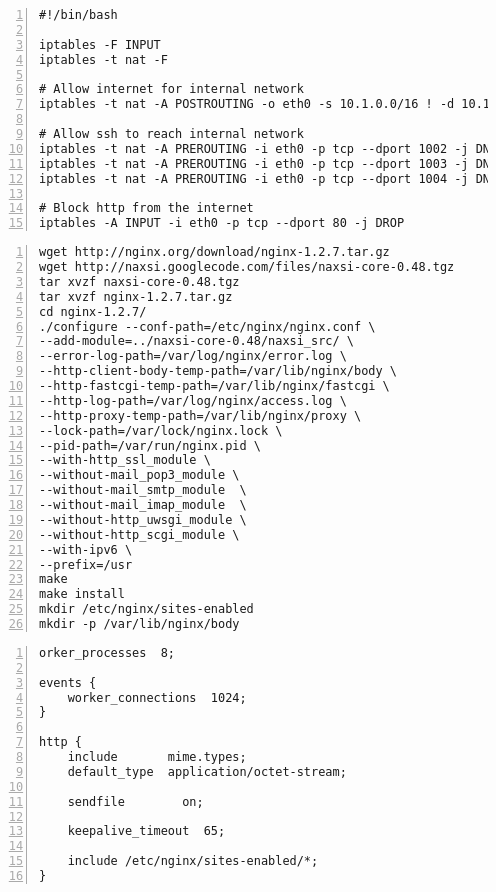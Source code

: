 \documentclass[Configuration]{subfiles}
\begin{document}
\begin{lstlisting}[frame=single,caption=/etc/network/interfaces,backgroundcolor=\color{gray},breaklines=true,numbers=left,]
#!/bin/bash

iptables -F INPUT
iptables -t nat -F

# Allow internet for internal network
iptables -t nat -A POSTROUTING -o eth0 -s 10.1.0.0/16 ! -d 10.1.0.0/8 -j SNAT --to-source 145.100.104.61

# Allow ssh to reach internal network
iptables -t nat -A PREROUTING -i eth0 -p tcp --dport 1002 -j DNAT --to-destination 10.1.2.2:22
iptables -t nat -A PREROUTING -i eth0 -p tcp --dport 1003 -j DNAT --to-destination 10.1.3.2:22
iptables -t nat -A PREROUTING -i eth0 -p tcp --dport 1004 -j DNAT --to-destination 10.1.4.2:22

# Block http from the internet
iptables -A INPUT -i eth0 -p tcp --dport 80 -j DROP
\end{lstlisting}

\begin{lstlisting}[frame=single,caption=Compiling nginx+naxsi,backgroundcolor=\color{gray},breaklines=true,numbers=left,]
wget http://nginx.org/download/nginx-1.2.7.tar.gz
wget http://naxsi.googlecode.com/files/naxsi-core-0.48.tgz
tar xvzf naxsi-core-0.48.tgz
tar xvzf nginx-1.2.7.tar.gz
cd nginx-1.2.7/
./configure --conf-path=/etc/nginx/nginx.conf \
--add-module=../naxsi-core-0.48/naxsi_src/ \
--error-log-path=/var/log/nginx/error.log \
--http-client-body-temp-path=/var/lib/nginx/body \
--http-fastcgi-temp-path=/var/lib/nginx/fastcgi \
--http-log-path=/var/log/nginx/access.log \
--http-proxy-temp-path=/var/lib/nginx/proxy \
--lock-path=/var/lock/nginx.lock \
--pid-path=/var/run/nginx.pid \
--with-http_ssl_module \
--without-mail_pop3_module \
--without-mail_smtp_module  \
--without-mail_imap_module  \
--without-http_uwsgi_module \
--without-http_scgi_module \
--with-ipv6 \
--prefix=/usr
make
make install
mkdir /etc/nginx/sites-enabled
mkdir -p /var/lib/nginx/body
\end{lstlisting}

\begin{lstlisting}[frame=single,caption=/etc/nginx/nginx.conf,backgroundcolor=\color{gray},breaklines=true,numbers=left,]
orker_processes  8;

events {
    worker_connections  1024;
}

http {
    include       mime.types;
    default_type  application/octet-stream;

    sendfile        on;

    keepalive_timeout  65;

    include /etc/nginx/sites-enabled/*;
}
\end{lstlisting}
\end{document}
